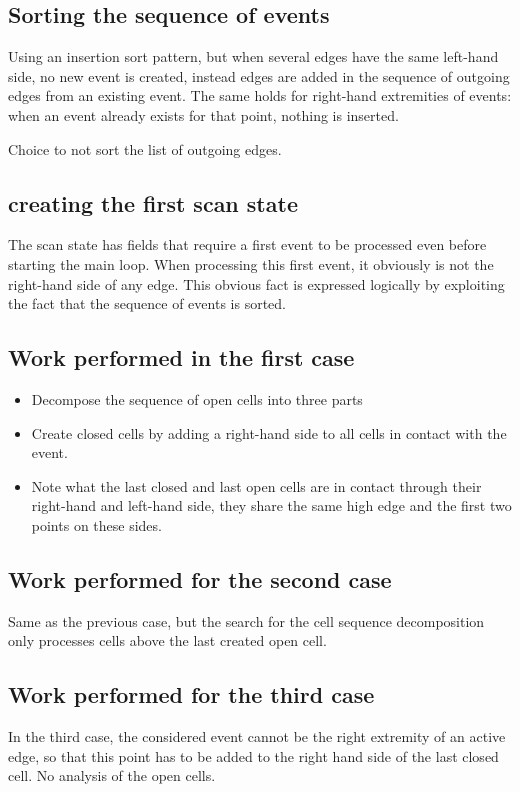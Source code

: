 \documentclass[a4paper, USenglish, cleveref, autoref, thm-restate]{lipics-v2021}
\begin{document}
\subsection{Sorting the sequence of events}
Using an insertion sort pattern, but when several edges have the same
left-hand side, no new event is created, instead edges are added in
the sequence of outgoing edges from an existing event.  The same holds
for right-hand extremities of events: when an event already exists for
that point, nothing is inserted.

Choice to not sort the list of outgoing edges.

\subsection{creating the first scan state}

The scan state has fields that require a first event to be processed
even before starting the main loop.  When processing this first event,
it obviously is not the right-hand side of any edge.  This obvious
fact is expressed logically by exploiting the fact that the sequence
of events is sorted.

\subsection{Work performed in the first case}
\begin{itemize}
\item Decompose the sequence of open cells into three parts
\item Create closed cells by adding a right-hand side to all cells in contact
with the event.
\item Note what the last closed and last open cells are in contact
  through their right-hand and left-hand side, they share the same
  high edge and the first two points on these sides.
\end{itemize}
\subsection{Work performed for the second case}
Same as the previous case, but the search for the cell sequence
decomposition only processes cells above the last created open cell.
\subsection{Work performed for the third case}
In the third case, the considered event cannot be the right extremity of
an active edge, so that this point has to be added to the right hand side
of the last closed cell.  No analysis of the open cells.
\end{document}
